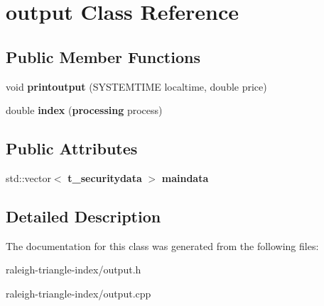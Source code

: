 \section{output Class Reference}
\label{classoutput}
\subsection*{Public Member Functions}
\begin{DoxyCompactItemize}
\item 
void {\bfseries printoutput} (S\+Y\+S\+T\+E\+M\+T\+I\+ME localtime, double price)\label{classoutput_a04412f41e2d21d92ef70dfe430746c95}

\item 
double {\bfseries index} ({\bf processing} process)\label{classoutput_a03121b39a882a4cc142125130c34e5b5}

\end{DoxyCompactItemize}
\subsection*{Public Attributes}
\begin{DoxyCompactItemize}
\item 
std\+::vector$<$ {\bf t\+\_\+securitydata} $>$ {\bfseries maindata}\label{classoutput_afd54f0a8e1b199c6f12990edca6b0965}

\end{DoxyCompactItemize}


\subsection{Detailed Description}


The documentation for this class was generated from the following files\+:\begin{DoxyCompactItemize}
\item 
raleigh-\/triangle-\/index/output.\+h\item 
raleigh-\/triangle-\/index/output.\+cpp\end{DoxyCompactItemize}
